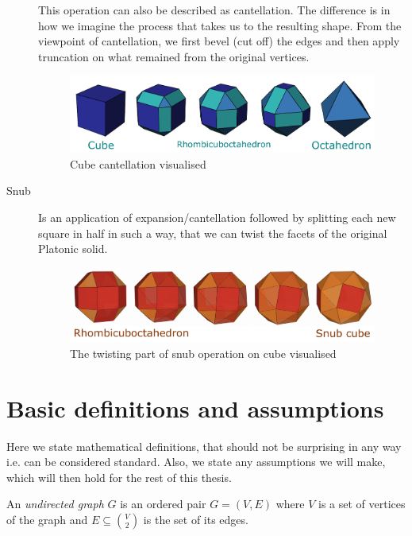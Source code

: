\begin{description}
    This operation can also be described as cantellation. The difference is in how we imagine the process that takes us to the resulting shape. From the viewpoint of cantellation, we first bevel (cut off) the edges and then apply truncation on what remained from the original vertices.
    \begin{figure}[H]
        \centering
        \includegraphics[width=1\textwidth]{../Resources/Figs/op_cantellation.pdf}
        \caption{Cube cantellation visualised \cite{wikimedia-cube-cantellation}}
        \label{fig:op_cantellation}
    \end{figure}
    \item[Snub] Is an application of expansion/cantellation followed by splitting each new square in half in such a way, that we can twist the facets of the original Platonic solid.
    \begin{figure}[H]
        \centering
        \includegraphics[width=1\textwidth]{../Resources/Figs/op_snub.pdf}
        \caption{The twisting part of snub operation on cube visualised \cite{natal-polyhed-viewer}}
        \label{fig:op_snub}
    \end{figure}
    
\end{description}

\section{Basic definitions and assumptions}

Here we state mathematical definitions, that should not be surprising in any way i.e. can be considered standard. Also, we state any assumptions we will make, which will then hold for the rest of this thesis.

\begin{defn}
    An \emph{undirected graph} $G$ is an ordered pair $G=(V,E)$ where $V$ is a set of vertices of the graph and $E \subseteq \binom{V}{2}$ is the set of its edges. 
\end{defn}

